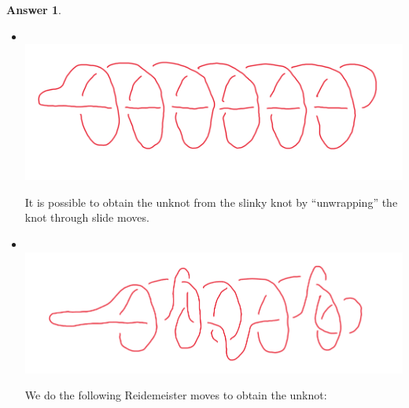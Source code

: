 \documentclass[article, 12pt]{article}
\theoremstyle{definition}
\newtheorem{answer}{Answer}
\begin{document}
    \begin{answer} \ 

        \begin{itemize}
            \item \ \\ \includegraphics[scale=.4]{slinky.png}
            
            It is possible to obtain the unknot from the slinky knot by ``unwrapping'' the knot through slide moves. 
            \item \ \\ \includegraphics[scale=.4]{croc.png}
            
            We do the following Reidemeister moves to obtain the unknot:


\end{itemize}
\end{answer}
\end{document}
